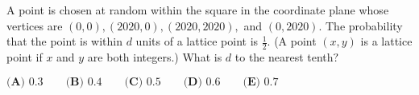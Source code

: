 A point is chosen at random within the square in the coordinate plane whose vertices are $(0, 0), (2020, 0), (2020, 2020),$ and $(0, 2020)$. The probability that the point is within $d$ units of a lattice point is $\tfrac{1}{2}$. (A point $(x, y)$ is a lattice point if $x$ and $y$ are both integers.) What is $d$ to the nearest tenth$?$

$\textbf{(A) } 0.3 \qquad \textbf{(B) } 0.4 \qquad \textbf{(C) } 0.5 \qquad \textbf{(D) } 0.6 \qquad \textbf{(E) } 0.7$